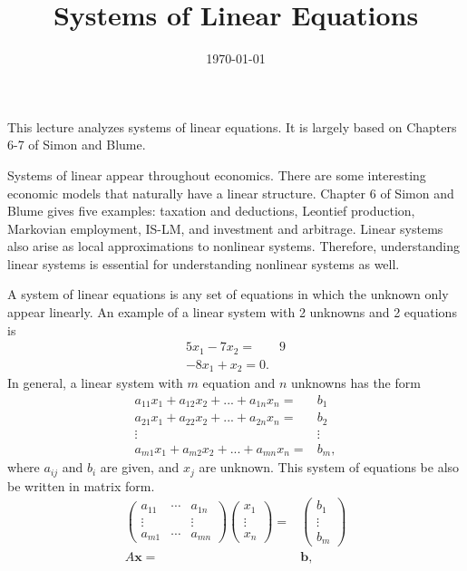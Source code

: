\documentclass[12pt,reqno]{amsart}
\title{Systems of Linear Equations}
\date{\today}
\theoremstyle{definition}
\begin{document}
\maketitle

This lecture analyzes systems of linear equations. It is largely based
on Chapters 6-7 of Simon and Blume. 

Systems of linear appear throughout economics. There are some
interesting economic models that naturally have a linear
structure. Chapter 6 of Simon and Blume gives five examples: taxation
and deductions, Leontief production, Markovian employment, IS-LM, and
investment and arbitrage. Linear systems also arise as local
approximations to nonlinear systems. Therefore, understanding linear
systems is essential for understanding nonlinear systems as well.

A system of linear equations is any set of equations in which the
unknown only appear linearly. An example of a linear system with 2
unknowns and 2 equations is
\begin{align*}
  5 x_1 - 7 x_2 = & 9 \\
  -8 x_1 + x_2 = 0.
\end{align*}
In general, a linear system with $m$ equation and $n$ unknowns has the
form 
\begin{align*}
  a_{11} x_1 + a_{12} x_2 + ... + a_{1n} x_n = & b_1 \\
  a_{21} x_1 + a_{22} x_2 + ... + a_{2n} x_n = & b_2 \\
  \vdots & \vdots \\
  a_{m1} x_1 + a_{m2} x_2 + ... + a_{mn} x_n = & b_m ,
\end{align*}
where $a_{ij}$ and $b_i$ are given, and $x_j$ are unknown.  This
system of equations be also be written in matrix form.
\begin{align*}
  \begin{pmatrix} a_{11} &  \cdots & a_{1n} \\
    \vdots & & \vdots \\
    a_{m1} & \cdots & a_{mn} 
  \end{pmatrix} 
  \begin{pmatrix} x_1 \\ \vdots \\ x_n
  \end{pmatrix} = & \begin{pmatrix} b_1 \\ \vdots \\ b_m
  \end{pmatrix} \\
  A \mathbf{x} = & \mathbf{b},
\end{align*}
\end{document}
